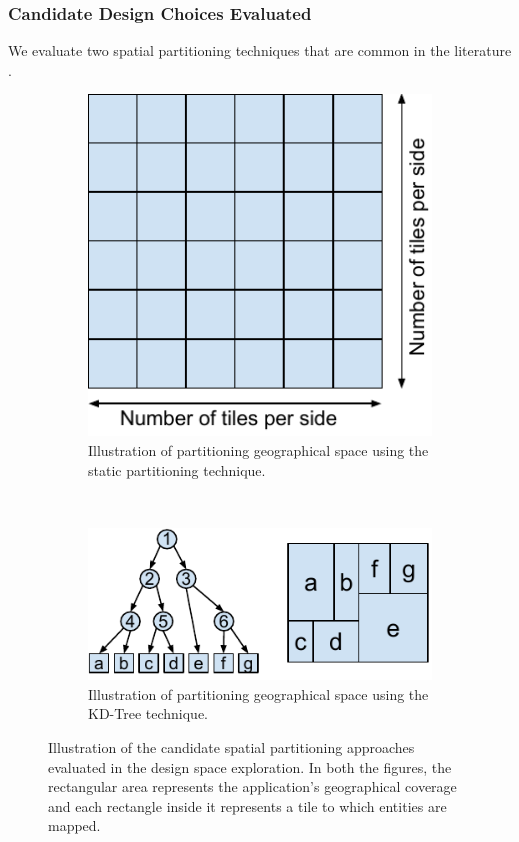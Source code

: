 \subsubsection{Candidate Design Choices Evaluated}
We evaluate two spatial partitioning techniques that are common in the literature \cite{mmog_kdtree, talkycars}.

\begin{figure}
\centering
\begin{subfigure}{0.3\textwidth}
  \centering
  \includegraphics[width=\linewidth]{figures/design_space/spatial/static_partitioning.pdf}
  \caption{Illustration of partitioning geographical space using the static partitioning technique.}
  \label{fig:static_part}
\end{subfigure}%
~~~~~~~~
\begin{subfigure}{0.6\textwidth}
  \centering
  \includegraphics[width=\linewidth]{figures/design_space/spatial/kdtree_partitioning.pdf}
  \caption{Illustration of partitioning geographical space using the KD-Tree technique.}
  \label{fig:kdtree_part}
\end{subfigure}\par\medskip
\caption{Illustration of the candidate spatial partitioning approaches evaluated in the design space exploration. In both the figures, the rectangular area represents the application's geographical coverage and each rectangle inside it represents a tile to which entities are mapped.}
\end{figure}

